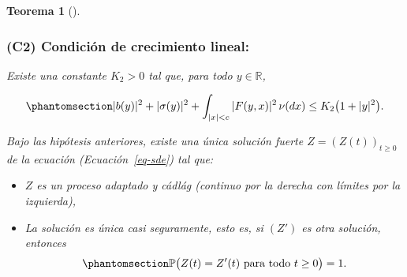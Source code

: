 \documentclass[
  spanish,
  us-letterpaper,
]{scrreprt}
\providecommand{\tightlist}{%
  \setlength{\itemsep}{0pt}\setlength{\parskip}{0pt}}
\theoremstyle{plain}
\newtheorem{theorem}{Teorema}[chapter]
\theoremstyle{plain}
\theoremstyle{plain}
\theoremstyle{definition}
\theoremstyle{remark}
\begin{document}
\begin{theorem}[]
\subsubsection{(C2) Condición de crecimiento
lineal:}\label{c2-condiciuxf3n-de-crecimiento-lineal}

Existe una constante \(K_2 > 0\) tal que, para todo
\(y \in \mathbb{R}\),

\begin{equation}\phantomsection\label{eq-3}{
|b(y)|^2 + |\sigma(y)|^2 + \int_{|x| < c} |F(y, x)|^2 \, \nu(dx)
\leq K_2 \bigl(1 + |y|^2 \bigr).
}\end{equation}

Bajo las hipótesis anteriores, existe una única solución fuerte
\(Z = (Z(t))_{t \geq 0}\) de la ecuación (Ecuación~\ref{eq-sde}) tal
que:

\begin{itemize}
\tightlist
\item
  \(Z\) es un proceso adaptado y cádlág (continuo por la derecha con
  límites por la izquierda),
\item
  La solución es única casi seguramente, esto es, si \((Z')\) es otra
  solución, entonces \begin{equation}\phantomsection\label{eq-4}{
   \mathbb{P}\bigl(Z(t) = Z'(t) \text{ para todo } t \geq 0\bigr) = 1.
   }\end{equation}
\end{itemize}

\end{theorem}
\end{document}
